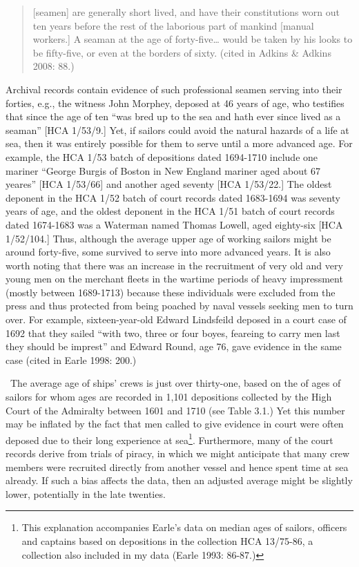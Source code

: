 \documentclass[12pt]{article}
\newenvironment{styleStandard}{\renewcommand\baselinestretch{1.0}\setlength\leftskip{0cm}\setlength\rightskip{0cm plus 1fil}\setlength\parindent{0cm}\setlength\parfillskip{0pt plus 1fil}\setlength\parskip{0in plus 1pt}\writerlistparindent\writerlistleftskip\leavevmode\normalfont\normalsize\writerlistlabel\ignorespaces}{\unskip\vspace{0in plus 1pt}\par}
\newcommand\writerlistleftskip{}
\newcommand\writerlistparindent{}
\newcommand\writerlistlabel{}
\begin{document}
\begin{quotation}
[seamen] are generally short lived, and have their constitutions worn out ten years before the rest of the laborious part of mankind [manual workers.] A seaman at the age of forty-five… would be taken by his looks to be fifty-five, or even at the borders of sixty. (cited in Adkins \& Adkins 2008: 88.) 

\end{quotation}
\begin{styleStandard}
Archival records contain evidence of such professional seamen serving into their forties, e.g., the witness John Morphey, deposed at 46 years of age, who testifies that since the age of ten “was bred up to the sea and hath ever since lived as a seaman” [HCA 1/53/9.] Yet, if sailors could avoid the natural hazards of a life at sea, then it was entirely possible for them to serve until a more advanced age. For example, the HCA 1/53 batch of depositions dated 1694-1710 include one mariner “George Burgis of Boston in New England mariner aged about 67 yeares” [HCA 1/53/66] and another aged seventy [HCA 1/53/22.] The oldest deponent in the HCA 1/52 batch of court records dated 1683-1694 was seventy years of age, and the oldest deponent in the HCA 1/51 batch of court records dated 1674-1683 was a Waterman named Thomas Lowell, aged eighty-six [HCA 1/52/104.] Thus, although the average upper age of working sailors might be around forty-five, some survived to serve into more advanced years. It is also worth noting that there was an increase in the recruitment of very old and very young men on the merchant fleets in the wartime periods of heavy impressment (mostly between 1689-1713) because these individuals were excluded from the press and thus protected from being poached by naval vessels seeking men to turn over. For example, sixteen-year-old Edward Lindsfeild deposed in a court case of 1692 that they sailed “with two, three or four boyes, feareing to carry men last they should be imprest” and Edward Round, age 76, gave evidence in the same case (cited in Earle 1998: 200.) 
\end{styleStandard}


\begin{styleStandard}
\ The average age of ships’ crews is just over thirty-one, based on the of ages of sailors for whom ages are recorded in 1,101 depositions collected by the High Court of the Admiralty between 1601 and 1710 (see Table 3.1.) Yet this number may be inflated by the fact that men called to give evidence in court were often deposed due to their long experience at sea\footnote{ This explanation accompanies Earle’s data on median ages of sailors, officers and captains based on depositions in the collection HCA 13/75-86, a collection also included in my data (Earle 1993: 86-87.)}. Furthermore, many of the court records derive from trials of piracy, in which we might anticipate that many crew members were recruited directly from another vessel and hence spent time at sea already. If such a bias affects the data, then an adjusted average might be slightly lower, potentially in the late twenties.
\end{styleStandard}
\end{document}
